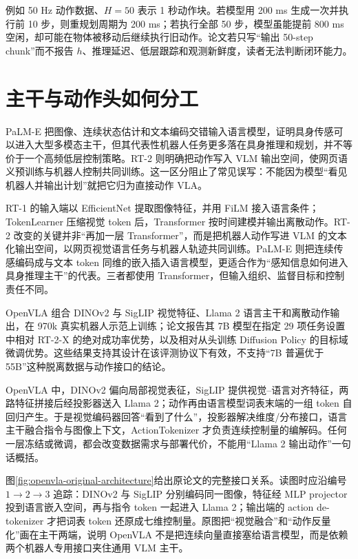 例如 50 Hz 动作数据、$H=50$ 表示 1 秒动作块。若模型用 200 ms 生成一次并执行前 10 步，则重规划周期为 200 ms；若执行全部 50 步，模型虽能提前 800 ms 空闲，却可能在物体被移动后继续执行旧动作。论文若只写“输出 50-step chunk”而不报告 $h$、推理延迟、低层跟踪和观测新鲜度，读者无法判断闭环能力。

\section{主干与动作头如何分工}

PaLM-E 把图像、连续状态估计和文本编码交错输入语言模型，证明具身传感可以进入大型多模态主干，但其代表性机器人任务更多落在具身推理和规划，并不等价于一个高频低层控制策略\cite{driess2023palme}。RT-2 则明确把动作写入 VLM 输出空间，使网页语义预训练与机器人控制共同训练\cite{brohan2023rt2}。这一区分阻止了常见误写：不能因为模型“看见机器人并输出计划”就把它归为直接动作 VLA。

RT-1 的输入端以 EfficientNet 提取图像特征，并用 FiLM 接入语言条件；TokenLearner 压缩视觉 token 后，Transformer 按时间建模并输出离散动作。RT-2 改变的关键并非“再加一层 Transformer”，而是把机器人动作写进 VLM 的文本化输出空间，以网页视觉语言任务与机器人轨迹共同训练。PaLM-E 则把连续传感编码成与文本 token 同维的嵌入插入语言模型，更适合作为“感知信息如何进入具身推理主干”的代表。三者都使用 Transformer，但输入组织、监督目标和控制责任不同。

OpenVLA 组合 DINOv2 与 SigLIP 视觉特征、Llama 2 语言主干和离散动作输出，在 970k 真实机器人示范上训练；论文报告其 7B 模型在指定 29 项任务设置中相对 RT-2-X 的绝对成功率优势，以及相对从头训练 Diffusion Policy 的目标域微调优势\cite{kim2024openvla}。这些结果支持其设计在该评测协议下有效，不支持“7B 普遍优于 55B”这种脱离数据与动作接口的结论。

OpenVLA 中，DINOv2 偏向局部视觉表征，SigLIP 提供视觉--语言对齐特征，两路特征拼接后经投影器送入 Llama 2；动作再由语言模型词表末端的一组 token 自回归产生。于是视觉编码器回答“看到了什么”，投影器解决维度/分布接口，语言主干融合指令与图像上下文，ActionTokenizer 才负责连续控制量的编解码。任何一层冻结或微调，都会改变数据需求与部署代价，不能用“Llama 2 输出动作”一句话概括。

图\ref{fig:openvla-original-architecture}给出原论文的完整接口关系。读图时应沿编号 $1\rightarrow2\rightarrow3$ 追踪：DINOv2 与 SigLIP 分别编码同一图像，特征经 MLP projector 投到语言嵌入空间，再与指令 token 一起进入 Llama 2；输出端的 action de-tokenizer 才把词表 token 还原成七维控制量。原图把“视觉融合”和“动作反量化”画在主干两端，说明 OpenVLA 不是把连续向量直接塞给语言模型，而是依赖两个机器人专用接口夹住通用 VLM 主干。

